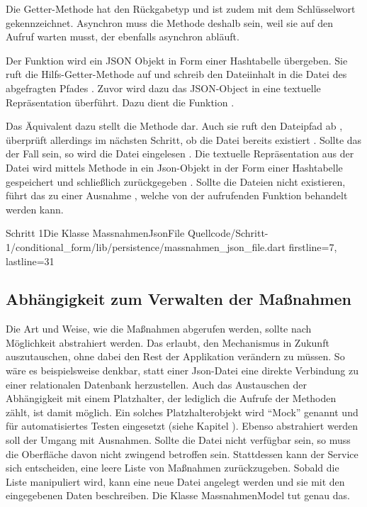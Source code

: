 Die Getter-Methode  hat den Rückgabetyp  und ist zudem mit dem Schlüsselwort  gekennzeichnet. Asynchron muss die Methode deshalb sein, weil sie auf den Aufruf  warten musst, der ebenfalls asynchron abläuft.

Der Funktion   wird ein JSON Objekt in Form einer Hashtabelle übergeben. Sie ruft die Hilfs-Getter-Methode   auf und schreib den Dateiinhalt in die Datei des abgefragten Pfades . Zuvor wird dazu das JSON-Object in eine textuelle Repräsentation überführt. Dazu dient die Funktion .

Das Äquivalent dazu stellt die Methode   dar. Auch sie ruft den Dateipfad ab , überprüft allerdings im nächsten Schritt, ob die Datei bereits existiert . Sollte das der Fall sein, so wird die Datei eingelesen . Die textuelle Repräsentation aus der Datei wird mittels Methode  in ein Json-Objekt in der Form einer Hashtabelle gespeichert  und schließlich zurückgegeben . Sollte die Dateien nicht existieren, führt das zu einer Ausnahme , welche von der aufrufenden Funktion behandelt werden kann.

\begin{alexlisting}{Schritt 1}{Die Klasse MassnahmenJsonFile}
  {Quellcode/Schritt-1/conditional_form/lib/persistence/massnahmen_json_file.dart}
  {firstline=7, lastline=31}
  \label{lst:Schritt1KlasseMassnahmenJsonFile}
\end{alexlisting}

\clearpage
\subsection{ Abhängigkeit zum Verwalten der Maßnahmen}

Die Art und Weise, wie die Maßnahmen abgerufen werden, sollte nach Möglichkeit abstrahiert werden. Das erlaubt, den Mechanismus in Zukunft auszutauschen, ohne dabei den Rest der Applikation verändern zu müssen. So wäre es beispielsweise denkbar, statt einer Json-Datei eine direkte Verbindung zu einer relationalen Datenbank herzustellen. Auch das Austauschen der Abhängigkeit mit einem Platzhalter, der lediglich die Aufrufe der Methoden zählt, ist damit möglich. Ein solches Platzhalterobjekt wird \enquote{Mock} genannt und für automatisiertes Testen eingesetzt (siehe Kapitel  ). Ebenso abstrahiert werden soll der Umgang mit Ausnahmen. Sollte die Datei nicht verfügbar sein, so muss die Oberfläche davon nicht zwingend betroffen sein. Stattdessen kann der Service sich entscheiden, eine leere Liste von Maßnahmen zurückzugeben. Sobald die Liste manipuliert wird, kann eine neue Datei angelegt werden und sie mit den eingegebenen Daten beschreiben. Die Klasse MassnahmenModel \Lst{\ref{lst:Schritt1KlasseMassnahmenModel}} tut genau das. 







